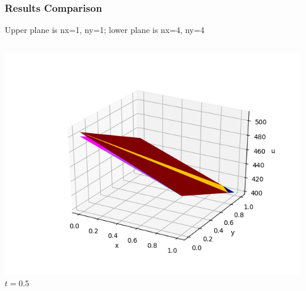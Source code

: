 \documentclass[]{beamer}
\begin{document}
\begin{frame}[t]\frametitle{Results Comparison}
  Upper plane is nx=1, ny=1; lower plane is nx=4, ny=4
  	\begin{columns}
			\begin{center}
			\includegraphics[scale=0.2]{figures/2D_xy_ls1m/2D_xy_ls1mat_u_vs_x_05}\\
			\tiny$t=0.5$
			
			\null
			

\end{center}
\end{columns}
\end{frame}
\end{document}
